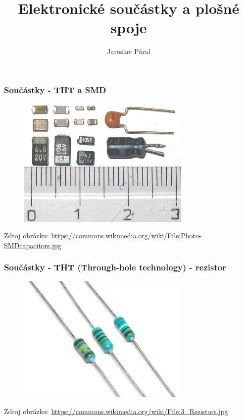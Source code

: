 \documentclass[12;pt,t]{beamer} %
\author{Jaroslav Páral}
\institute[paral.jarek@gmail.com]{FI MUNI: F5090\\[0.5cm]}
\title{Elektronické součástky a plošné spoje}
\newcommand{\srctext}[1]{{\fontsize{7}{9}\selectfont\textcolor{sourcesclr}{#1}}}
\begin{document}
\frame{\titlepage}

\begin{frame}
    \frametitle{Součástky - THT a SMD}
    	\begin{figure}[H]
            \includegraphics[width=0.75\textwidth]{img/Photo-SMDcapacitors.jpg}
    	\end{figure}
    	    \srctext{Zdroj obrázku: \url{https://commons.wikimedia.org/wiki/File:Photo-SMDcapacitors.jpg}}
\end{frame}

\begin{frame}
\frametitle{Součástky - THT (Through-hole technology) - rezistor}
\begin{figure}[H]
	\includegraphics[width=0.75\textwidth]{img/3_Resistors.jpg}
\end{figure}
\srctext{Zdroj obrázku: \url{
	https://commons.wikimedia.org/wiki/File:3_Resistors.jpg}}
\end{frame}
\end{document}

